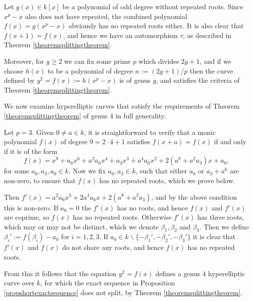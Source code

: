     \begin{ex}
    Let $g(x) \in k[x]$ be a polynomial of odd degree without repeated roots.
    Since $x^p -x$ also does not have repeated, the combined polynomial $f(x) = g(x^p - x)$ obviously has no repeated roots either.
    It is also clear that $f(x + 1) = f(x)$, and hence we have an automorphism $\tau$, as described in Theorem \ref{theoremsplittingtheorem}.

    Moreover, for $g \geq 2$ we can fix some prime $p$ which divides $2g+1$, and if we choose $h(x)$ to be a polynomial of degree $n := (2g+1)/p$ then the curve defined by $y^2 = f(x) := h(x^p - x)$ is of genus $g$, and satisfies the criteria of Theorem \ref{theoremsplittingtheorem}.
    \end{ex}

We now examine hyperelliptic curves that satisfy the requirements of Theorem \ref{theoremsplittingtheorem} of genus 4 in full generality.

    \begin{ex}
    Let $p = 3$.
    Given $0 \neq a \in k$, it is straightforward to verify that a monic polynomial $f(x)$ of degree $9 = 2\cdot 4 +1$ satisfies $f(x+a) = f(x)$ if and only if it is of the form
    \begin{equation*}
    f(x) = x^9 + a_6x^6 + a^2a_6x^4 + a_3x^3 + a^4a_6x^2 + 2(a^8 + a^2a_3)x + a_0,
    \end{equation*}
    for some $a_6, a_3, a_0 \in k$.
    Now we fix $a_6, a_3 \in k$, such that either $a_6$ or $a_3 + a^6$ are non-zero, to ensure that $f(x)$ has no repeated roots, which we prove below.
    
    Then $f'(x) = a^2a_6x^3 + 2a^4a_6x + 2(a^8 + a^2a_3)$, and by the above condition this is non-zero.
    If $a_6 = 0$ the $f'(x)$ has no roots, and hence $f(x)$ and $f'(x)$ are coprime, so $f(x)$ has no repeated roots.
    Otherwise $f'(x)$ has three roots, which may or may not be distinct, which we denote $\beta_1, \beta_2$ and $\beta_3$.
    Then we define $\beta_i' := f(\beta_i) - a_0$ for $i = 1, 2, 3$.
    If $a_0 \in k \backslash \{-\beta_1', -\beta_2', -\beta_3'\}$ it is clear that $f'(x)$ and $f(x)$ do not share any roots, and hence $f(x)$ has no repeated roots.
    
    From this it follows that the equation $y^2 = f(x)$ defines a genus $4$ hyperelliptic curve over $k$, for which the exact sequence in Proposition \ref{propshortexactsequence} does not split, by Theorem \ref{theoremsplittingtheorem}.
    \end{ex}

